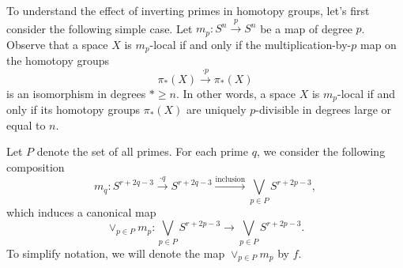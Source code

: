         



To understand the effect of inverting primes in homotopy groups, let's first consider the following simple case.
Let $m_p:S^n \xrightarrow{p}S^n$ be a map of degree $p$.
Observe that a space $X$ is $m_p$-local if and only if the multiplication-by-$p$ map on the homotopy groups
\[
\pi_{*}(X) \xrightarrow{\cdot p} \pi_{*}(X)
\]
is an isomorphism in degrees $*\geq n$. In other words, a space $X$ is $m_p$-local if and only if its homotopy groups $\pi_*(X)$ are uniquely $p$-divisible in degrees large or equal to $n$.

Let $P$ denote the set of all primes. For each prime $q$, we consider the following composition 
\[
 m_q: S^{r+2q-3} 
\xrightarrow{\cdot q} S^{r+2q-3} \xrightarrow{\text{inclusion}}  \bigvee_{p \in P}S^{r+2p-3},
\]
which induces a canonical map  
\begin{equation}
\label{f map}
	\vee_{p\in P} m_p: \bigvee_{p\in P}S^{r+2p-3} \to \bigvee_{p\in P}S^{r+2p-3}.
\end{equation}
To simplify notation, we will denote the map $ \vee_{p\in P} m_p$ by $f$.


